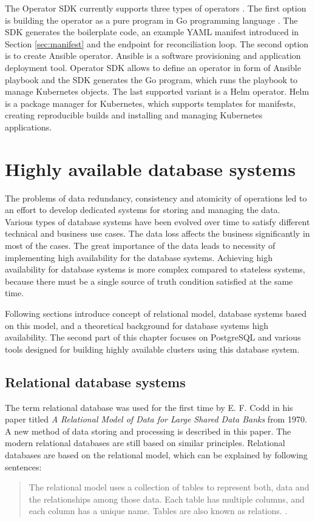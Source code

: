 \documentclass[
  digital, %
  twoside, %
  table,   %
  lof,     %
  lot,     %
]{fithesis3}
\begin{document}
The Operator SDK currently supports three types of operators \cite{operatorhub-sdk}. The first option is building the operator as a pure program in Go programming language \cite{golang}. The SDK generates the boilerplate code, an example YAML manifest introduced in Section \ref{sec:manifest} and the endpoint for reconciliation loop. The second option is to create Ansible operator. Ansible \cite{ansible} is a software provisioning and application deployment tool. Operator SDK allows to define an operator in form of Ansible playbook \cite{wwp} and the SDK generates the Go program, which runs the playbook to manage Kubernetes objects. The last supported variant is a Helm operator. Helm \cite{helm} is a package manager for Kubernetes, which supports templates for manifests, creating reproducible builds and installing and managing Kubernetes applications.

\chapter{Highly available database systems} \label{chap:ha_database_systems}
The problems of data redundancy, consistency and atomicity of operations led to an effort to develop dedicated systems for storing and managing the data. Various types of database systems have been evolved over time to satisfy different technical and business use cases. The data loss affects the business significantly in most of the cases. The great importance of the data leads to necessity of implementing high availability for the database systems. Achieving high availability for database systems is more complex compared to stateless systems, because there must be a single source of truth condition satisfied at the same time.

Following sections introduce concept of relational model, database systems based on this model, and a theoretical background for database systems high availability. The second part of this chapter focuses on PostgreSQL and various tools designed for building highly available clusters using this database system.

\section{Relational database systems}
The term relational database was used for the first time by E. F. Codd in his paper \cite{codd_relational_model} titled \textit{A Relational Model of Data for Large Shared Data Banks} from 1970. A new method of data storing and processing is described in this paper. The modern relational databases are still based on similar principles. Relational databases are based on the relational model, which can be explained by following sentences:
\begin{quote}
The relational model uses a collection of tables to represent both, data and the relationships among those data. Each table has multiple columns, and each column has a unique name. Tables are also known as relations. \cite[p. 9]{db}.
\end{quote}
\end{document}
